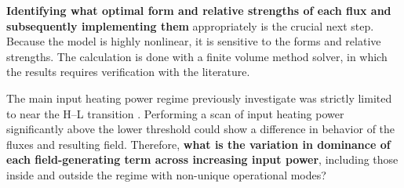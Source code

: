 \textbf{Identifying what optimal form and relative strengths of each flux and subsequently implementing them} appropriately is the crucial next step.
Because the model is highly nonlinear, it is sensitive to the forms and relative strengths.
The calculation is done with a finite volume method solver, in which the results requires verification with the literature.

The main input heating power regime previously investigate was strictly limited to near the H--L transition \cite{staps_backstepping_2017}.
Performing a scan of input heating power significantly above the lower threshold could show a difference in behavior of the fluxes and resulting field.
Therefore, \textbf{what is the variation in dominance of each field-generating term across increasing input power}, including those inside and outside the regime with non-unique operational modes?

